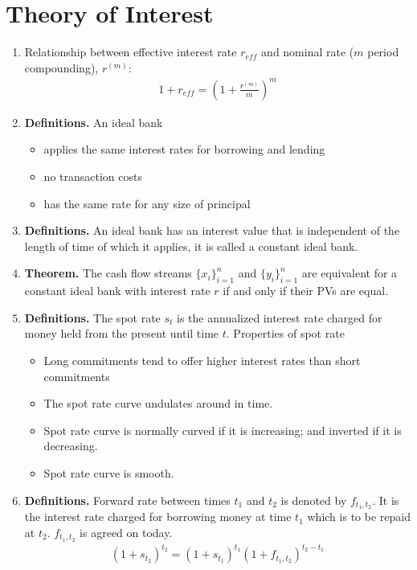 \documentclass[12pt,twoside]{article}
\begin{document}



\section{Theory of Interest}

\begin{enumerate}
\item Relationship between effective interest rate $r_{eff}$ and nominal rate ($m$ period compounding), $r^{(m)}$:
	\begin{align*}
		1+r_{eff} = \left(1+\frac{r^{(m)}}{m}\right)^{m}
	\end{align*}

\item \textbf{Definitions.} An ideal bank
	\begin{itemize}
		\item applies the same interest rates for borrowing and lending
		\item no transaction costs
		\item has the same rate for any size of principal
	\end{itemize}

\item \textbf{Definitions.} An ideal bank has an interest value that is independent of the length of time of which it applies, it is called a constant ideal bank.

\item \textbf{Theorem.} The cash flow streams $\lbrace x_i \rbrace_{i=1}^n$ and $\lbrace y_i \rbrace_{i=1}^n$ are equivalent for a constant ideal bank with interest rate $r$ if and only if their PVs are equal. 

\item \textbf{Definitions.} The spot rate $s_t$ is the annualized interest rate charged for money held from the present until time $t$. Properties of spot rate
	\begin{itemize}
		\item Long commitments tend to offer higher interest rates than short commitments
		\item The spot rate curve undulates around in time.
		\item Spot rate curve is normally curved if it is increasing; and inverted if it is decreasing.
		\item Spot rate curve is smooth.
	\end{itemize}

\item \textbf{Definitions.} Forward rate between times $t_1$ and $t_2$ is denoted by $f_{t_1,t_2}$. It is the interest rate charged for borrowing money at time $t_1$ which is to be repaid at $t_2$. $f_{t_1,t_2}$ is agreed on today.
\begin{align*}
	(1+s_{t_2})^{t_2} = (1+s_{t_1})^{t_1}(1+f_{t_1, t_2})^{t_2-t_1}
\end{align*}


\end{enumerate}
\end{document}
